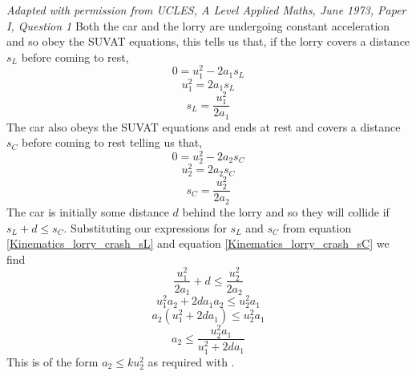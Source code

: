 

\begin{problem}[A1973AMIQ1p]
{ 
}
{\textit{Adapted with permission from UCLES, A Level Applied Maths, June 1973, Paper I, Question 1}}
{Both the car and the lorry are undergoing constant acceleration and so obey the SUVAT equations, this tells us that, if the lorry covers a distance $s_L$ before coming to rest,
		\begin{equation*}0=u_1^2-2a_1s_L	\end{equation*}
		\begin{equation*}u_1^2=2a_1s_L	\end{equation*}
		\begin{equation}\label{Kinematics_lorry_crash_sL}s_L=\frac{u_1^2}{2a_1}	\end{equation}
	The car also obeys the SUVAT equations and ends at rest and covers a distance $s_C$ before coming to rest telling us that,
		\begin{equation*}0=u_2^2-2a_2s_C	\end{equation*}
		\begin{equation*}u_2^2=2a_2s_C	\end{equation*}
		\begin{equation}\label{Kinematics_lorry_crash_sC}s_C=\frac{u_2^2}{2a_2}	\end{equation}
	The car is initially some distance $d$ behind the lorry and so they will collide if $s_L+d\le s_C$. Substituting our expressions for $s_L$ and $s_C$ from equation \eqref{Kinematics_lorry_crash_sL} and equation \eqref{Kinematics_lorry_crash_sC} we find
		\begin{equation*}\frac{u_1^2}{2a_1}+d\le\frac{u_2^2}{2a_2}		\end{equation*}
		\begin{equation*}u_1^{2}a_2+2da_1a_2\le u_2^{2}a_1			\end{equation*}
		\begin{equation*}a_2\left(u_1^{2}+2da_1\right)\le u_2^{2}a_1		\end{equation*}
		\begin{equation*}a_2\le\frac{u_2^{2}a_1}{u_1^{2} + 2da_1}		\end{equation*}
	This is of the form $a_2\le k u_2^2$ as required with .
}
\end{problem}